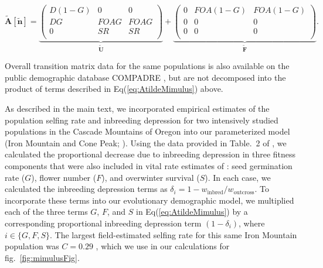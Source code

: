 \documentclass[11pt]{article}
\def\mbf#1{\mathbf{#1}}
\begin{document}
\begin{linenomath*}
\begin{equation} \label{eq:AtildeMimulus}
	\mathbf{\tilde{A}}[\tilde{\mbf{n}}] = 
			\underbrace{\left(
			\begin{array}{ccc}
				D(1 - G) & 0 & 0 \\
				DG & FOAG & FOAG \\
				0 & SR & SR \\
			\end{array} \right)}_{\tilde{\mbf{U}}} +
			\underbrace{\left(
			\begin{array}{ccc}
				0 & FOA(1 - G) & FOA(1 - G) \\
				0 & 0 & 0 \\
				0 & 0 & 0 \\
			\end{array} \right)}_{\tilde{\mbf{F}}}.
\end{equation}
\end{linenomath*}

Overall transition matrix data for the same populations is also available on the public demographic database COMPADRE \citep{CompadreDB2020}, but are not decomposed into the product of terms described in Eq(\ref{eq:AtildeMimulus}) above.

As described in the main text, we incorporated empirical estimates of the population selfing rate and inbreeding depression for two intensively studied populations in the Cascade Mountains of Oregon into our parameterized model (Iron Mountain and Cone Peak; \citealt{Willis1993,Willis1999a,Willis1999b}). Using the data provided in Table.~2 of \citet{Willis1993}, we calculated the proportional decrease due to inbreeding depression in three fitness components that were also included in vital rate estimates of \citet{PetersonEtAl2016}: seed germination rate ($G$), flower number ($F$), and overwinter survival ($S$). In each case, we calculated the inbreeding depression terms as $\delta_i = 1 - w_{\text{inbred}}/w_{\text{outcross}}$. To incorporate these terms into our evolutionary demographic model, we multiplied each of the three terms $G$, $F$, and $S$ in Eq(\ref{eq:AtildeMimulus}) by a corresponding proportional inbreeding depression term $(1 - \delta_i)$, where $i \in \{ G,F,S\}$. The largest field-estimated selfing rate for this same Iron Mountain population was $C = 0.29$ \citep{Willis1993}, which we use in our calculations for fig.~\ref{fig:mimulusFig}.
\end{document}
